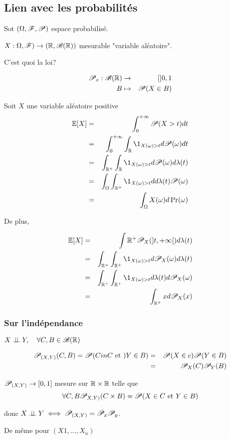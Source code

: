 \subsection{Lien avec les probabilités}




Sot $(\Omega, \mathscr{F}, \mathscr{P})$ espace probabilisé.

$X : \Omega,    \mathscr{F}) \to (\mathbb{R},  \mathscr{B}(\mathbb{R})) $ mesurable "variable aléatoire".

C'est quoi la loi?

\begin{eqnarray*}
	\mathscr{P}_x: \mathscr{B} (\mathbb{R}) &\to& []0,1 \\
	B &\mapsto& \mathscr{P}(X  \in B)
\end{eqnarray*}

Soit $X$ une variable aléatoire positive\\
\begin{eqnarray*}
	\E[X] &=& \int_0^{+\infty} \Pro (X> t) d t\\
	&=& \int_0^{+\infty}\int_\R \1_{X(\omega)>t}d \Pro (\omega) d t\\
	&=& \int_{\R^+} \int_{\R} \1_{X(\omega)>t}d \Pro (\omega) d \lambda(t) \\ %
	&=& \int_{\Omega} \int_{\R^+} \1_{X(\omega)>t}d d \lambda(t) \Pro (\omega)  \\%
	&=& \int_{\Omega} X(\omega) d \Pr(\omega)
\end{eqnarray*}

De plus,


\begin{eqnarray*}
	\E[X] &=& \int{\R^+} \Pro_X(]t, +\infty[) d \lambda (t) \\
	&=& \int_{\R^+} \int_{\R^+} \1_{X(\omega)>t}d \Pro_X (\omega) d \lambda(t) \\
	&=& \int_{\R^+} \int_{\R^+} \1_{X(\omega)>t}d \lambda(t) d\Pro_X (\omega)  \\ %
	&=& \int_{\R^+} x d\Pro_X (x)
\end{eqnarray*}



\subsubsection{Sur l'indépendance}

$X \perp\!\!\! \perp Y, \quad \forall C,B \in \mathscr{B} (\mathbb{R})$ %

\begin{eqnarray*}
	\mathscr{P}_{(X,Y)}(C,B)= \mathscr{P} (C    in C \text{ et }) Y \in B) &=& \mathscr{P}(X\in c) \mathscr{P}(Y\in B)\\
	&=& \mathscr{P}_X(C) \mathscr{P}_Y( B)
\end{eqnarray*}


$\mathscr{P}_{(X,Y)} \to [0,1]$ mesure sur $\mathbb{R} \times \mathbb{R}$ telle que
$$\forall C,B\mathscr{P}_{X,Y)}(C\times B) = \mathscr{P} (X\in C \text{ et } Y \in B)$$

donc $X \perp\!\!\! \perp Y\iff \mathscr{P}_{(X,Y)} = \mathscr{P}_x \mathscr{P}_y$.

De même pour $(X1, \dots, X_n)$

